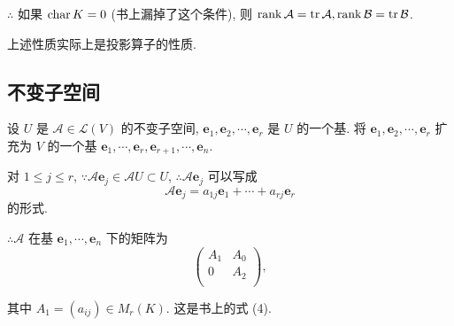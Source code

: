 \documentclass{ctexart}
\begin{document}
$\therefore$ 如果 $\operatorname{char} K=0$ (书上漏掉了这个条件), 则 $\operatorname{rank} \mathcal{A}=\operatorname{tr} \mathcal{A},\operatorname{rank} \mathcal{B}=\operatorname{tr} \mathcal{B}$.

上述性质实际上是投影算子的性质.
\subsection{不变子空间}
设 $U$ 是 $\mathcal{A}\in\mathcal{L}(V)$ 的不变子空间, $\boldsymbol{e}_1,\boldsymbol{e}_2,\cdots,\boldsymbol{e}_r$ 是 $U$ 的一个基. 将 $\boldsymbol{e}_1,\boldsymbol{e}_2,\cdots,\boldsymbol{e}_r$ 扩充为 $V$ 的一个基 $\boldsymbol{e}_1,\cdots,\boldsymbol{e}_r,\boldsymbol{e}_{r+1},\cdots,\boldsymbol{e}_n$.

对 $1\leq j\leq r$, $\because\mathcal{A}\boldsymbol{e}_j\in\mathcal{A}U\subset U$, $\therefore\mathcal{A}\boldsymbol{e}_j$ 可以写成
\[\mathcal{A}\boldsymbol{e}_j=a_{1j}\boldsymbol{e}_1+\cdots+a_{rj}\boldsymbol{e}_r\]
的形式.

$\therefore\mathcal{A}$ 在基 $\boldsymbol{e}_1,\cdots,\boldsymbol{e}_n$ 下的矩阵为
\begin{equation}\label{eq3.1}
    \begin{pmatrix}
        A_1 & A_0 \\
        0 & A_2 \\
    \end{pmatrix},
\end{equation}

其中 $A_1=(a_{ij})\in M_r(K)$. 这是书上的式 (4).
\end{document}

